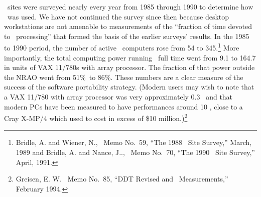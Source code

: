 \AIPS\ sites were surveyed nearly every year from 1985 through 1990 to
determine how \AIPS\ was used.  We have not continued the survey since
then because desktop workstations are not amenable to measurements of
the ``fraction of time devoted to \AIPS\ processing'' that formed the
basis of the earlier surveys' results.  In the 1985 to 1990 period,
the number of active \AIPS\ computers rose from 54 to
345.\footnote{Bridle, A. and Wiener, N., \AIPS\ Memo No.~59, ``The
1988 \AIPS\ Site Survey,'' March, 1989 and Bridle, A. and Nance, J..,
\AIPS\ Memo No.~70, ``The 1990 \AIPS\ Site Survey,'' April, 1991.}
More importantly, the total computing power running \AIPS\ full time
went from 9.1 to 164.7 in units of VAX 11/780s with array processor.
The fraction of that power outside the NRAO went from 51\%\ to 86\%.
These numbers are a clear measure of the success of the software
portability strategy.  (Modern users may wish to note that a VAX
11/780 with array processor was very approximately 0.3 \AMarks\ and
that modern PCs have been measured to have performances around 10
\AMarks, close to a Cray X-MP/4 which used to cost in excess of \$10
million.)\footnote{Greisen, E. W. \AIPS\ Memo No.~85, ``DDT Revised
and \AMark\ Measurements,'' February 1994.}


